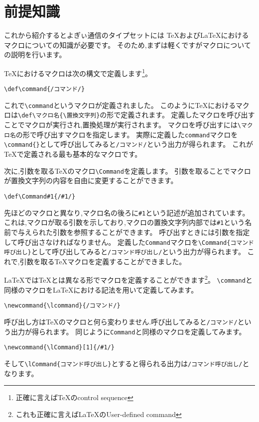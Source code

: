 \section{前提知識}
\newcommand{\lcommand}{/コマンド/}
\newcommand{\lCommand}[1]{/#1/}
{
\def\command{/コマンド/}
\def\Command#1{/#1/}

これから紹介するとよぎぃ通信のタイプセットには
{\TeX}および{\LaTeX}におけるマクロについての知識が必要です。
そのため,まずは軽くですがマクロについての説明を行います。

{\TeX}におけるマクロは次の構文で定義します\footnote{正確に言えば{\TeX}のcontrol sequence}。
\begin{verbatim}
\def\command{/コマンド/}
\end{verbatim}

これで\verb|\command|というマクロが定義されました。
このように{\TeX}におけるマクロは\verb|\def\マクロ名{\置換文字列}|の形で定義されます。
定義したマクロを呼び出すことでマクロが実行され,置換処理が実行されます。
マクロを呼び出すには\verb|\マクロ名|の形で呼び出すマクロを指定します。
実際に定義した\verb|command|マクロを\verb|\command{}|として呼び出してみると\texttt{\command{}}という出力が得られます。
これが{\TeX}で定義される最も基本的なマクロです。

次に,引数を取る{\TeX}のマクロ\verb|\Command|を定義します。
引数を取ることでマクロが置換文字列の内容を自由に変更することができます。
\begin{verbatim}
\def\Command#1{/#1/}
\end{verbatim}
先ほどのマクロと異なり,マクロ名の後ろに\verb|#1|という記述が追加されています。
これは,マクロが取る引数を示しており,マクロの置換文字列内部では\verb|#1|という名前で与えられた引数を参照することができます。
呼び出すときには引数を指定して呼び出さなければなりません。
定義した\texttt{Command}マクロを\verb|\Command{コマンド呼び出し}|として呼び出してみると\texttt{\Command{コマンド呼び出し}}という出力が得られます。
これで,引数を取る{\TeX}マクロを定義することができました。

{\LaTeX}では{\TeX}とは異なる形でマクロを定義することができます\footnote{これも正確に言えば{\LaTeX}のUser-defined command}。
\verb|\command|と同様のマクロを{\LaTeX}における記法を用いて定義してみます。
\begin{verbatim}
\newcommand{\lcommand}{/コマンド/}
\end{verbatim}
}
呼び出し方は{\TeX}のマクロと何ら変わりません.呼び出してみると\texttt{\lcommand{}}という出力が得られます。
同じように\verb|Command|と同様のマクロを定義してみます。
\begin{verbatim}
\newcommand{\lCommand}[1]{/#1/}
\end{verbatim}
そして\verb|\lCommand{コマンド呼び出し}|とすると得られる出力は\texttt{\lCommand{コマンド呼び出し}}となります。

